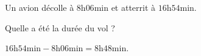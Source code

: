 \begin{exercice}
    Un avion décolle à $8\text{h}06\text{min}$ et atterrit à $16\text{h}54\text{min}$.
    
    Quelle a été la durée du vol ?
\end{exercice}
\begin{corrige}
    $16\text{h}54\text{min}-8\text{h}06\text{min} = 8\text{h}48\text{min}$.
\end{corrige}